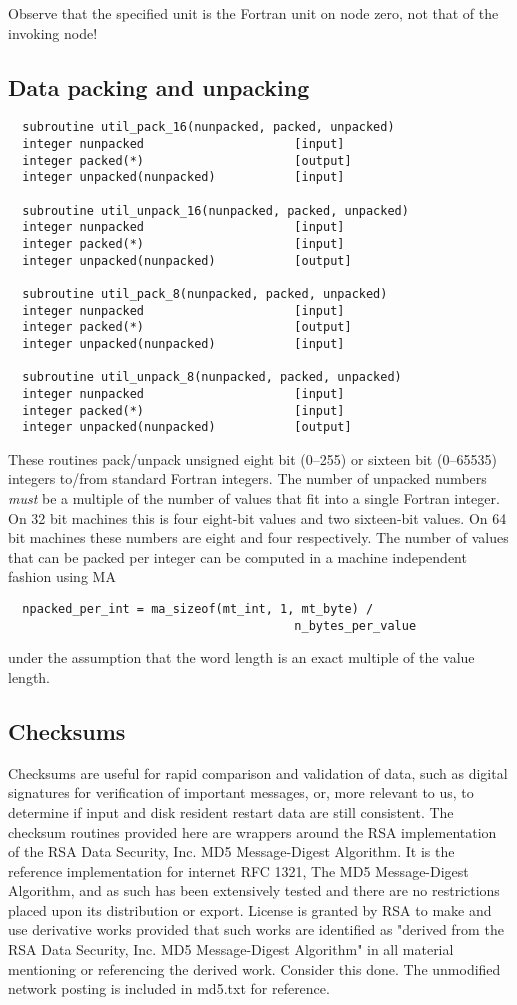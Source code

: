 Observe that the specified unit is the Fortran unit on node zero, not
that of the invoking node!

\subsection{Data packing and unpacking}
\begin{verbatim}
  subroutine util_pack_16(nunpacked, packed, unpacked)
  integer nunpacked                     [input]
  integer packed(*)                     [output]
  integer unpacked(nunpacked)           [input]

  subroutine util_unpack_16(nunpacked, packed, unpacked)
  integer nunpacked                     [input]
  integer packed(*)                     [input]
  integer unpacked(nunpacked)           [output]

  subroutine util_pack_8(nunpacked, packed, unpacked)
  integer nunpacked                     [input]
  integer packed(*)                     [output]
  integer unpacked(nunpacked)           [input]

  subroutine util_unpack_8(nunpacked, packed, unpacked)
  integer nunpacked                     [input]
  integer packed(*)                     [input]
  integer unpacked(nunpacked)           [output]
\end{verbatim}
These routines pack/unpack unsigned eight bit (0--255) or sixteen bit
(0--65535) integers to/from standard Fortran integers.  The number of
unpacked numbers {\em must} be a multiple of the number of values that
fit into a single Fortran integer.  On 32 bit machines this is four
eight-bit values and two sixteen-bit values.  On 64 bit machines these
numbers are eight and four respectively.  The number of values that
can be packed per integer can be computed in a machine
independent fashion using MA
\begin{verbatim}
  npacked_per_int = ma_sizeof(mt_int, 1, mt_byte) / 
                                        n_bytes_per_value
\end{verbatim}
under the assumption that the word length is an exact multiple of the
value length.

\subsection{Checksums}

Checksums are useful for rapid comparison and validation of data, such
as digital signatures for verification of important messages, or, more
relevant to us, to determine if input and disk resident restart data
are still consistent.  The checksum routines provided here are
wrappers around the RSA implementation of the RSA Data Security, Inc.
MD5 Message-Digest Algorithm.  It is the reference implementation for
internet RFC 1321, The MD5 Message-Digest Algorithm, and as such has
been extensively tested and there are no restrictions placed upon its
distribution or export.  License is granted by RSA to make and use
derivative works provided that such works are identified as "derived
from the RSA Data Security, Inc. MD5 Message-Digest Algorithm" in all
material mentioning or referencing the derived work.  Consider this
done.  The unmodified network posting is included in md5.txt for
reference.


